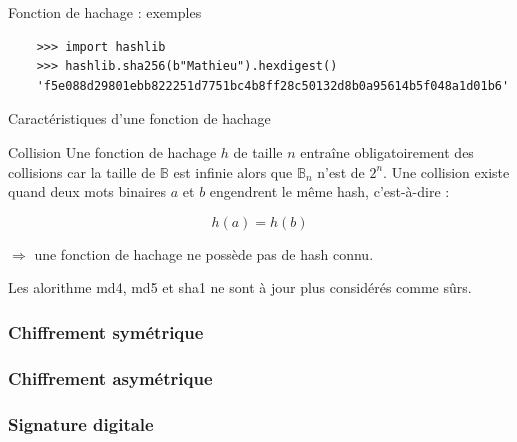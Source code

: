 \begin{frame}[fragile]{Fonction de hachage : exemples}
  \begin{verbatim}
    >>> import hashlib
    >>> hashlib.sha256(b"Mathieu").hexdigest()
    'f5e088d29801ebb822251d7751bc4b8ff28c50132d8b0a95614b5f048a1d01b6'
  \end{verbatim}

  
\end{frame}

\begin{frame}{Caractéristiques d'une fonction de hachage}
  \begin{block}{Collision}
    Une fonction de hachage $h$ de taille $n$ entraîne obligatoirement des collisions car la taille de $\mathbb{B}$ est infinie alors que $\mathbb{B}_n$ n'est  de $2^n$.
    Une collision existe quand deux mots binaires $a$ et $b$ engendrent le même hash, c'est-à-dire :

    $$h(a) = h(b)$$

    $\Rightarrow$ une  fonction de hachage ne possède pas de hash connu.
  \end{block}

  Les alorithme md4, md5 et sha1 ne sont à jour plus considérés comme sûrs.
\end{frame}

\subsubsection{Chiffrement symétrique}
\subsubsection{Chiffrement asymétrique}
\subsubsection{Signature digitale}


